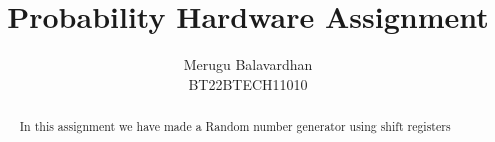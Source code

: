 \documentclass[12pt]{article}
\begin{document}
	
	\vspace{3cm}
	
	\title{Probability Hardware Assignment}
	\author{\Large Merugu Balavardhan \\ BT22BTECH11010}
	\date{}

\maketitle

\begin{abstract}
	In this assignment we have made a Random number generator using shift registers
\end{abstract}


\end{document}
